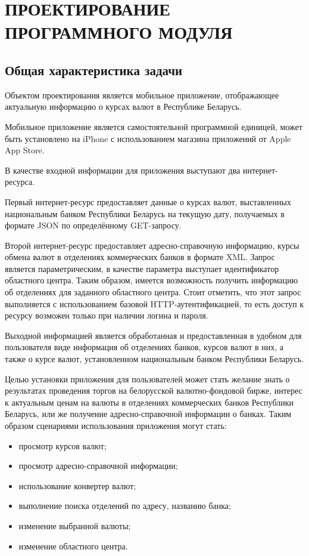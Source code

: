 \section[Проектирование программного модуля]{%
  ПРОЕКТИРОВАНИЕ ПРОГРАММНОГО МОДУЛЯ
}

\label{sec:design}


\subsection{Общая характеристика задачи}

Объектом проектирования является мобильное приложение,
отображающее актуальную информацию о курсах валют в Республике Беларусь.

Мобильное приложение является самостоятельной программной единицей,
может быть установлено на iPhone с
использованием магазина приложений от Apple App Store.

В качестве входной информации для приложения выступают два интернет-ресурса.

Первый интернет-ресурс предоставляет данные о курсах валют, выставленных
национальным банком Республики Беларусь на текущую дату,
получаемых в формате JSON по определённому GET-запросу.

Второй интернет-ресурс предоставляет адресно-справочную информацию,
курсы обмена валют в отделениях коммерческих банков в формате XML. Запрос
является параметрическим, в качестве параметра выступает идентификатор
областного центра. Таким образом, имеется возможность получить информацию
об отделениях для заданного областного центра. Стоит отметить, что этот запрос
выполняется с использованием базовой HTTP-аутентификацией, то есть доступ
к ресурсу возможен только при наличии логина и пароля.

Выходной информацией является обработанная и предоставленная в удобном для
пользователя виде информация об отделениях банков, курсов валют в них,
а также о курсе валют, установленном национальным банком Республики Беларусь.

Целью установки приложения для пользователей может стать желание знать о
результатах проведения торгов на белорусской валютно-фондовой бирже,
интерес к актуальным ценам на валюты в отделениях коммерческих банков
Республики Беларусь, или же получение адресно-справочной информации о банках.
Таким образом сценариями использования приложения могут стать:
\begin{itemize}
  \item просмотр курсов валют;
  \item просмотр адресно-справочной информации;
  \item использование конвертер валют;
  \item выполнение поиска отделений по адресу, названию банка;
  \item изменение выбранной валюты;
  \item изменение областного центра.
\end{itemize}

